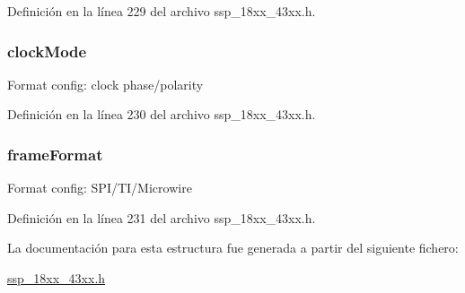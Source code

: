 Definición en la línea 229 del archivo ssp\+\_\+18xx\+\_\+43xx.\+h.

\subsubsection[{\texorpdfstring{clock\+Mode}{clockMode}}]{ clock\+Mode}\hypertarget{struct_s_s_p___config_format_aea7fde50f1241fb6909f613283e25db1}{}\label{struct_s_s_p___config_format_aea7fde50f1241fb6909f613283e25db1}
Format config\+: clock phase/polarity 

Definición en la línea 230 del archivo ssp\+\_\+18xx\+\_\+43xx.\+h.

\subsubsection[{\texorpdfstring{frame\+Format}{frameFormat}}]{ frame\+Format}\hypertarget{struct_s_s_p___config_format_ae0bcdd44e7013f8593095c1383b784b2}{}\label{struct_s_s_p___config_format_ae0bcdd44e7013f8593095c1383b784b2}
Format config\+: S\+P\+I/\+T\+I/\+Microwire 

Definición en la línea 231 del archivo ssp\+\_\+18xx\+\_\+43xx.\+h.



La documentación para esta estructura fue generada a partir del siguiente fichero\+:\begin{DoxyCompactItemize}
\item 
\hyperlink{ssp__18xx__43xx_8h}{ssp\+\_\+18xx\+\_\+43xx.\+h}\end{DoxyCompactItemize}
